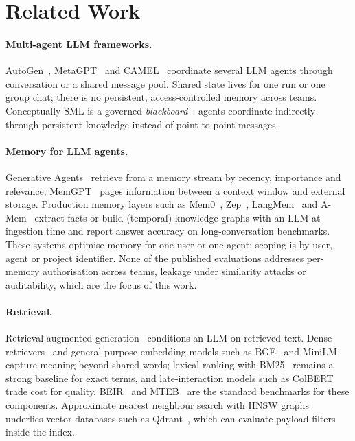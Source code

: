 \documentclass[11pt,a4paper]{article}
\newcommand{\sys}{SML}
\begin{document}
\section{Related Work}
\label{sec:related}

\paragraph{Multi-agent LLM frameworks.} AutoGen~\cite{wu2023autogen}, MetaGPT~\cite{hong2024metagpt} and
CAMEL~\cite{li2023camel} coordinate several LLM agents through conversation or a shared message pool.
Shared state lives for one run or one group chat; there is no persistent, access-controlled memory across
teams. Conceptually \sys{} is a governed \emph{blackboard}~\cite{wooldridge2009mas}: agents coordinate
indirectly through persistent knowledge instead of point-to-point messages.

\paragraph{Memory for LLM agents.} Generative Agents~\cite{park2023generative} retrieve from a memory
stream by recency, importance and relevance; MemGPT~\cite{packer2023memgpt} pages information between a
context window and external storage. Production memory layers such as Mem0~\cite{chhikara2025mem0},
Zep~\cite{rasmussen2025zep}, LangMem~\cite{langmem2025} and A-Mem~\cite{xu2025amem} extract facts or build
(temporal) knowledge graphs with an LLM at ingestion time and report answer accuracy on long-conversation
benchmarks. These systems optimise memory for one user or one agent; scoping is by user, agent or project
identifier. None of the published evaluations addresses per-memory authorisation across teams, leakage
under similarity attacks or auditability, which are the focus of this work.

\paragraph{Retrieval.} Retrieval-augmented generation~\cite{lewis2020rag} conditions an LLM on retrieved
text. Dense retrievers~\cite{reimers2019sbert,karpukhin2020dpr,lin2023dragon} and general-purpose embedding
models such as BGE~\cite{xiao2023cpack} and MiniLM~\cite{wang2020minilm} capture meaning beyond shared
words; lexical ranking with BM25~\cite{robertson2009bm25} remains a strong baseline for exact terms, and
late-interaction models such as ColBERT~\cite{khattab2020colbert} trade cost for quality. BEIR~\cite{thakur2021beir}
and MTEB~\cite{muennighoff2023mteb} are the standard benchmarks for these components. Approximate nearest
neighbour search with HNSW graphs~\cite{malkov2020hnsw} underlies vector databases such as
Qdrant~\cite{qdrant2024}, which can evaluate payload filters inside the index.
\end{document}
